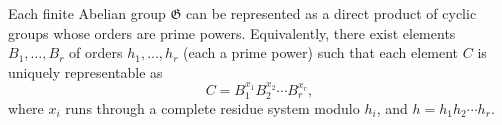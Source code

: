 Each finite Abelian group $\mathfrak{G}$ can be represented as a direct product of cyclic groups whose orders are prime powers. Equivalently, there exist elements $B_1,\ldots,B_r$ of orders $h_1,\ldots,h_r$ (each a prime power) such that each element $C$ is uniquely representable as
$$C = B_1^{x_1}B_2^{x_2}\cdots B_r^{x_r},$$
where $x_i$ runs through a complete residue system modulo $h_i$, and $h = h_1h_2\cdots h_r$.
